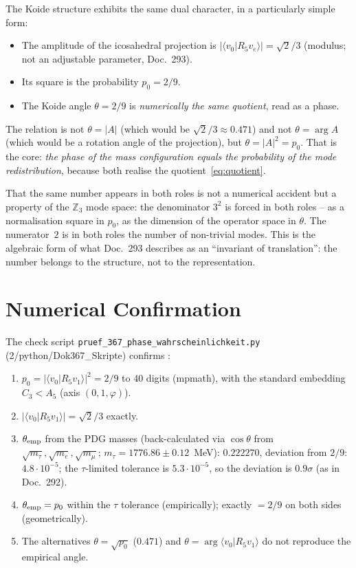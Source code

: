 The Koide structure exhibits the same dual character, in a particularly simple form:
\begin{itemize}
  \item The amplitude of the icosahedral projection is $|\langle v_0|R_5 v_e\rangle| = \sqrt2/3$
    (modulus; not an adjustable parameter, Doc.~293).
  \item Its square is the probability $p_0 = 2/9$.
  \item The Koide angle $\theta = 2/9$ is \emph{numerically the same quotient}, read as a phase.
\end{itemize}
The relation is not $\theta = |A|$ (which would be $\sqrt2/3 \approx 0.471$) and not
$\theta = \arg A$ (which would be a rotation angle of the projection), but $\theta = |A|^2 = p_0$.
That is the core: \emph{the phase of the mass configuration equals the probability of the mode
redistribution}, because both realise the quotient~\eqref{eq:quotient}.

That the same number appears in both roles is not a numerical accident but a property of the
$\mathbb{Z}_3$ mode space: the denominator $3^2$ is forced in both roles -- as a normalisation
square in $p_0$, as the dimension of the operator space in $\theta$. The numerator~$2$ is in both
roles the number of non-trivial modes. This is the algebraic form of what Doc.~293 describes as
an \enquote{invariant of translation}: the number belongs to the structure, not to the
representation.

\section{Numerical Confirmation}

The check script \texttt{pruef\_367\_phase\_wahrscheinlichkeit.py} (2/python/Dok367\_Skripte)
confirms \KM:
\begin{enumerate}
  \item $p_0 = |\langle v_0|R_5 v_1\rangle|^2 = 2/9$ to 40 digits (mpmath), with the standard
    embedding $C_3 < A_5$ (axis $(0,1,\varphi)$).
  \item $|\langle v_0|R_5 v_1\rangle| = \sqrt2/3$ exactly.
  \item $\theta_{\rm emp}$ from the PDG masses (back-calculated via $\cos\theta$ from
    $\sqrt{m_\tau},\sqrt{m_e},\sqrt{m_\mu}$; $m_\tau = 1776.86 \pm 0.12$~MeV): $0.222270$,
    deviation from $2/9$: $4.8\cdot10^{-5}$; the $\tau$-limited tolerance is
    $5.3\cdot10^{-5}$, so the deviation is $0.9\sigma$ (as in Doc.~292).
  \item $\theta_{\rm emp} = p_0$ within the $\tau$ tolerance (empirically); exactly $= 2/9$
    on both sides (geometrically).
  \item The alternatives $\theta = \sqrt{p_0}$ ($0.471$) and $\theta = \arg\langle v_0|R_5 v_1\rangle$
    do not reproduce the empirical angle.
\end{enumerate}

